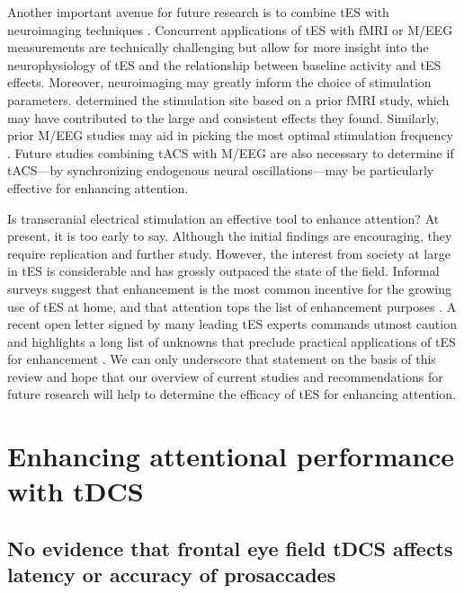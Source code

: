 \documentclass[11pt,english,]{memoir}
\begin{document}
Another important avenue for future research is to combine tES with neuroimaging techniques \autocite{Bergmann2016}. Concurrent applications of tES with fMRI or M/EEG measurements are technically challenging but allow for more insight into the neurophysiology of tES and the relationship between baseline activity and tES effects. Moreover, neuroimaging may greatly inform the choice of stimulation parameters. \textcite{Clark2012} determined the stimulation site based on a prior fMRI study, which may have contributed to the large and consistent effects they found. Similarly, prior M/EEG studies may aid in picking the most optimal stimulation frequency \autocite{vanDriel2015}. Future studies combining tACS with M/EEG are also necessary to determine if tACS---by synchronizing endogenous neural oscillations---may be particularly effective for enhancing attention.

Is transcranial electrical stimulation an effective tool to enhance attention? At present, it is too early to say. Although the initial findings are encouraging, they require replication and further study. However, the interest from society at large in tES is considerable and has grossly outpaced the state of the field. Informal surveys suggest that enhancement is the most common incentive for the growing use of tES at home, and that attention tops the list of enhancement purposes \autocite{Jwa2015}. A recent open letter signed by many leading tES experts commands utmost caution and highlights a long list of unknowns that preclude practical applications of tES for enhancement \autocite{Wurzman2016}. We can only underscore that statement on the basis of this review and hope that our overview of current studies and recommendations for future research will help to determine the efficacy of tES for enhancing attention.

\hypertarget{part-tDCS}{%
\part{Enhancing attentional performance with tDCS}\label{part-tDCS}}

\hypertarget{sacc-tDCS}{%
\chapter{No evidence that frontal eye field tDCS affects latency or accuracy of prosaccades}\label{sacc-tDCS}}

\end{document}
